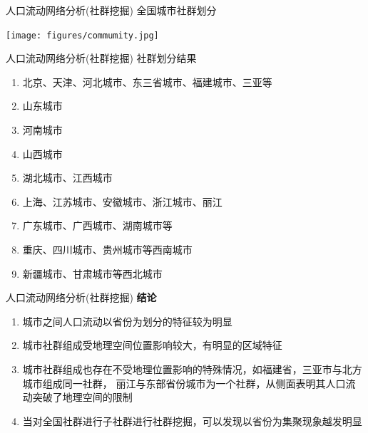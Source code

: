 \begin{frame}[t]{人口流动网络分析(社群挖掘)}
    全国城市社群划分

    \texttt{[image: figures/commumity.jpg]}
\end{frame}

\begin{frame}[t]{人口流动网络分析(社群挖掘)}
    \alert{社群划分结果}

    \begin{enumerate}
        \item 北京、天津、河北城市、东三省城市、福建城市、三亚等
        \item 山东城市
        \item 河南城市
        \item 山西城市
        \item 湖北城市、江西城市
        \item 上海、江苏城市、安徽城市、浙江城市、丽江
        \item 广东城市、广西城市、湖南城市等
        \item 重庆、四川城市、贵州城市等西南城市
        \item 新疆城市、甘肃城市等西北城市
    \end{enumerate}
\end{frame}

\begin{frame}[t]{人口流动网络分析(社群挖掘)}
    \textbf{结论}

    \begin{enumerate}
        \item 城市之间人口流动以省份为划分的特征较为明显
        \item 城市社群组成受地理空间位置影响较大，有明显的区域特征
        \item 城市社群组成也存在不受地理位置影响的特殊情况，如福建省，三亚市与北方城市组成同一社群，
              丽江与东部省份城市为一个社群，从侧面表明其人口流动突破了地理空间的限制
        \item 当对全国社群进行子社群进行社群挖掘，可以发现以省份为集聚现象越发明显
    \end{enumerate}
\end{frame}
